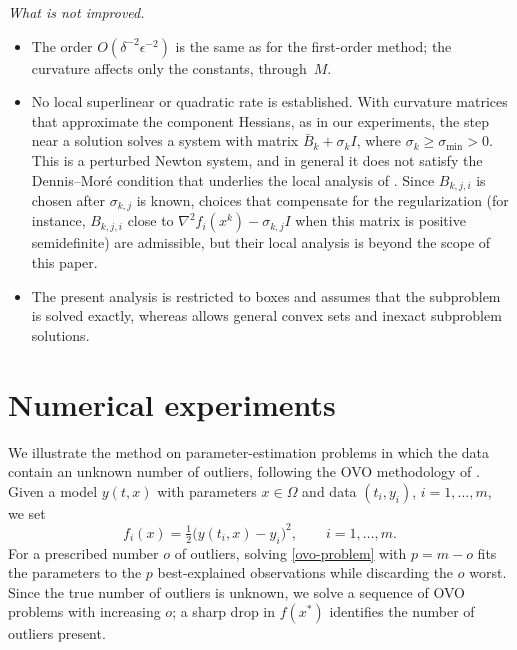 \documentclass[11pt]{article}
\begin{document}
\emph{What is not improved.}
\begin{itemize}
\item The order $O(\delta^{-2}\epsilon^{-2})$ is the same as for the
first-order method; the curvature affects only the constants, through~$M$.
\item No local superlinear or quadratic rate is established. With curvature
matrices that approximate the component Hessians, as in our experiments, the
step near a solution solves a system with matrix $\bar{B}_k + \sigma_k I$,
where $\sigma_k \geq \sigma_{\min} > 0$. This is a perturbed Newton system, and
in general it does not satisfy the Dennis--Mor\'e condition that underlies the
local analysis of \cite{yano1}. Since $B_{k,j,i}$ is chosen after
$\sigma_{k,j}$ is known, choices that compensate for the regularization
(for instance, $B_{k,j,i}$ close to $\nabla^2 f_i(x^k) - \sigma_{k,j} I$ when
this matrix is positive semidefinite) are admissible, but their local
analysis is beyond the scope of this paper.
\item The present analysis is restricted to boxes and assumes that the
subproblem is solved exactly, whereas \cite{yano1} allows general convex sets
and inexact subproblem solutions.
\end{itemize}

\section{Numerical experiments} \label{sec:numerical}

We illustrate the method on parameter-estimation problems in which the data
contain an unknown number of outliers, following the OVO methodology of
\cite{alvarezovo}. Given a model $y(t,x)$ with parameters $x\in\Omega$ and data
$(t_i,y_i)$, $i=1,\dots,m$, we set
\[
f_i(x)=\tfrac12\big(y(t_i,x)-y_i\big)^2,\qquad i=1,\dots,m.
\]
For a prescribed number $o$ of outliers, solving \eqref{ovo-problem} with
$p=m-o$ fits the parameters to the $p$ best-explained observations while
discarding the $o$ worst. Since the true number of outliers is unknown, we
solve a sequence of OVO problems with increasing $o$; a sharp drop in $f(x^*)$
identifies the number of outliers present.
\end{document}
